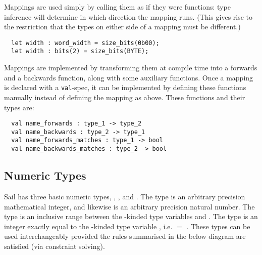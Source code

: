 Mappings are used simply by calling them as if they were functions:
type inference will determine in which direction the mapping
runs. (This gives rise to the restriction that the types on either
side of a mapping must be different.)

\begin{lstlisting}
  let width : word_width = size_bits(0b00);
  let width : bits(2) = size_bits(BYTE);
\end{lstlisting}

Mappings are implemented by transforming them at compile time into a
forwards and a backwards function, along with some auxiliary
functions. Once a mapping is declared with a \verb|val|-spec, it can
be implemented by defining these functions manually instead of
defining the mapping as above. These functions and their types are:

\begin{lstlisting}
  val name_forwards : type_1 -> type_2
  val name_backwards : type_2 -> type_1
  val name_forwards_matches : type_1 -> bool
  val name_backwards_matches : type_2 -> bool
\end{lstlisting}

\subsection{Numeric Types}
\label{sec:numeric}

Sail has three basic numeric types, , , and
. The type  is an arbitrary precision mathematical
integer, and likewise  is an arbitrary precision natural
number. The type  is an inclusive range between the
-kinded type variables  and . The type
 is an integer exactly equal to the -kinded type
variable , i.e.  $=$ . These types
can be used interchangeably provided the rules summarised in the below
diagram are satisfied (via constraint solving).

\begin{center}
\end{center}

